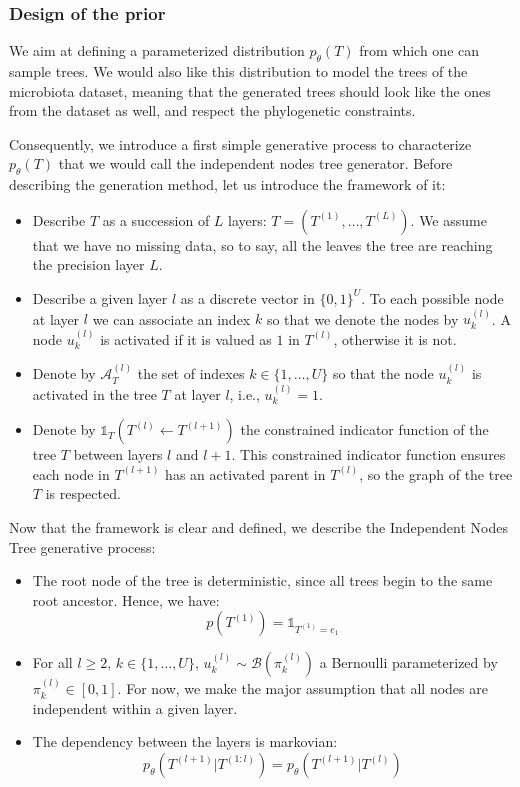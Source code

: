 \subsubsection{Design of the prior}


We aim at defining a parameterized distribution $p_{\theta}(T)$ from which one can sample trees.
We would also like this distribution to model the trees of the microbiota dataset, meaning that
the generated trees should look like the ones from the dataset as well, and respect the phylogenetic constraints. \\

\newcommand{\nodeindexsetgeneric}{\mathcal{A}_T^{(L)}}
\newcommand{\treeconstrainedindicator}{\mathds{1}_T(T^{(l)} \leftarrow T^{(l+1)})}

Consequently, we introduce a first simple generative process to characterize $p_{\theta}(T)$ that we would call the independent nodes tree generator.
Before describing the generation method, let us introduce the framework of it:
\begin{itemize}
    \item Describe $T$ as a succession of $L$ layers: $T = (T^{(1)}, \dots, T^{(L)})$.
          We assume that we have no missing data, so to say, all the leaves the tree are reaching the precision layer $L$.
    \item Describe a given layer $l$ as a discrete vector in $\{0, 1\}^{U}$.
          To each possible node at layer $l$ we can associate an index $k$ so that we denote the nodes by $u_k^{(l)}$.
          A node $u_k^{(l)}$ is activated if it is valued as $1$ in $T^{(l)}$, otherwise it is not.
    \item Denote by $\mathcal{A}_T^{(l)}$ the set of indexes $k \in \{1, \dots, U\}$ so that
          the node $u_k^{(l)}$ is activated in the tree $T$ at layer $l$, i.e., $u_k^{(l)} = 1$.
    \item Denote by $\treeconstrainedindicator$ the constrained indicator function of the tree $T$ between layers $l$ and $l+1$.
          This constrained indicator function ensures each node in $T^{(l+1)}$ has an activated parent in $T^{(l)}$, so the graph of the tree $T$ is respected.
\end{itemize}

Now that the framework is clear and defined, we describe the Independent Nodes Tree generative process:
\begin{itemize}
    \item The root node of the tree is deterministic, since all trees begin to the same root ancestor.
          Hence, we have:
          $$
            p(T^{(1)}) = \mathds{1}_{T^{(1)} = e_1}
          $$
    \item For all $l \geq 2$, $k \in \{1, \dots, U\}$, $u_k^{(l)} \sim \mathcal{B}(\pi_{k}^{(l)})$ a Bernoulli parameterized by $\pi_{k}^{(l)} \in [0,1]$.
          For now, we make the major assumption that all nodes are independent within a given layer.
    \item The dependency between the layers is markovian:
         $$
            p_{\theta}(T^{(l+1)} | T^{(1:l)}) = p_{\theta}(T^{(l+1)} | T^{(l)})
         $$
\end{itemize}

